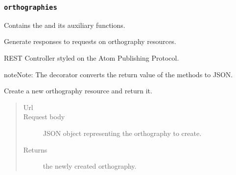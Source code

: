 \documentclass[letterpaper,10pt,english]{sphinxmanual}
\begin{document}
\subsubsection{\texttt{orthographies}}
\label{api:orthographies}\label{api:module-onlinelinguisticdatabase.controllers.orthographies}
Contains the {\hyperref[api:onlinelinguisticdatabase.controllers.orthographies.OrthographiesController]{}} and its auxiliary functions.
\label{api:module-orthographies}

\begin{fulllineitems}
\label{api:onlinelinguisticdatabase.controllers.orthographies.OrthographiesController}
Generate responses to requests on orthography resources.

REST Controller styled on the Atom Publishing Protocol.

\begin{notice}{note}{Note:}
The  decorator converts the return value of the methods to
JSON.
\end{notice}

\begin{fulllineitems}
\label{api:onlinelinguisticdatabase.controllers.orthographies.OrthographiesController.create}
Create a new orthography resource and return it.
\begin{quote}\begin{description}
\item[{Url }] \leavevmode
{}

\item[{Request body}] \leavevmode
JSON object representing the orthography to create.

\item[{Returns}] \leavevmode
the newly created orthography.

\end{description}\end{quote}

\end{fulllineitems}


\end{fulllineitems}
\end{document}
